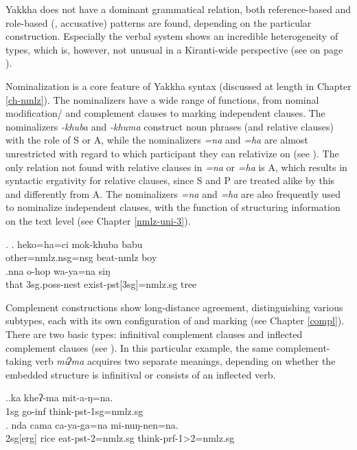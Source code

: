 Yakkha does not have a dominant grammatical relation, both reference-based and role-based (, accusative)  patterns are found, depending on the particular construction. Especially the verbal  system shows an incredible heterogeneity of  types, which is, however, not unusual in a Kiranti-wide perspective (see  on page \pageref{aligntables}). 

Nominalization is a core feature of Yakkha syntax (discussed at length in Chapter \ref{ch-nmlz}). The nominalizers have a wide range of functions, from nominal modification/ and complement clauses to marking independent clauses. The nominalizers \emph{-khuba} and \emph{-khuma} construct noun phrases (and relative clauses) with the role of S or A, while the nominalizers \emph{=na} and \emph{=ha} are almost unrestricted with regard to which participant they can relativize on (see \Next). The only relation not found with relative clauses in \emph{=na} or \emph{=ha} is A, which results in syntactic ergativity for relative clauses, since S and P are treated alike by this  and differently from A.
The nominalizers \emph{=na} and \emph{=ha} are also frequently used to nominalize independent clauses, with the function of structuring information  on the text level (see Chapter \ref{nmlz-uni-3}). 

\ex. \ag.   heko=ha=ci mok-khuba babu\\
			other{\sc =nmlz.nsg=nsg} beat{\sc -nmlz} boy\\
\bg.nna  o-hop wa-ya=na siŋ\\
		that {\sc 3sg.poss}-nest exist-{\sc pst[3sg]=nmlz.sg} tree\\
	

Complement constructions show long-distance agreement, distinguishing various subtypes, each with its own configuration of  and  marking (see Chapter \ref{compl}). There are two basic types: infinitival complement clauses and inflected complement clauses (see \Next). In this particular example, the same complement-taking verb \emph{miʔma} acquires two separate meanings, depending on whether the embedded structure is infinitival or consists of an inflected verb.

\ex.\ag.ka kheʔ-ma mit-a-ŋ=na.\\
{\sc 1sg} go{\sc -inf} think{\sc -pst-1sg=nmlz.sg}\\
\bg. nda cama ca-ya-ga=na mi-nuŋ-nen=na.\\
{\sc 2sg[erg]} rice eat-{\sc pst-2=nmlz.sg} think-{\sc prf-1>2=nmlz.sg}\\


